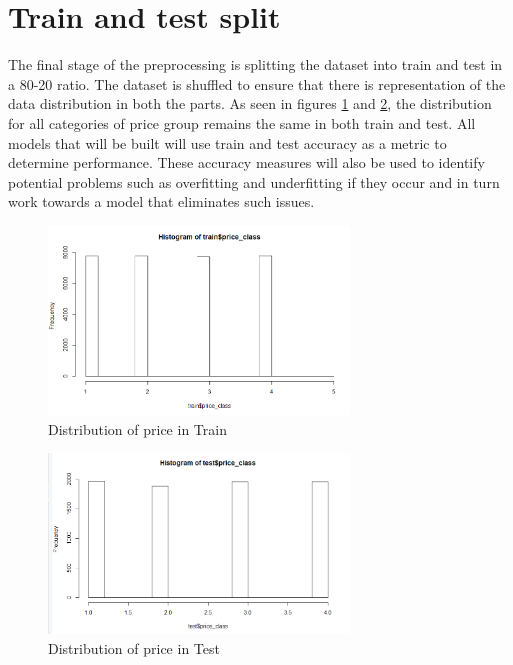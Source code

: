 \documentclass{sig-alternate}
\begin{document}
	\section{Train and test split}
	The final stage of the preprocessing is splitting the dataset into train and test in a 80-20 ratio. The dataset is shuffled to ensure that there is representation of the data distribution in both the parts. As seen in figures \ref{trainhist} and \ref{testhist}, the distribution for all categories of price group remains the same in both train and test. All models that will be built will use train and test accuracy as a metric to determine performance. These accuracy measures will also be used to identify potential problems such as overfitting and underfitting if they occur and in turn work towards a model that eliminates such issues.  
	\begin{figure}[ht]
		\includegraphics[width=8cm]{trainhist.png}
		\caption{Distribution of price in Train}
		\label{trainhist}
		\centering
	\end{figure}
	\begin{figure}[ht]
		\includegraphics[width=8cm]{testhist.png}
		\caption{Distribution of price in Test}
		\label{testhist}
		\centering
	\end{figure}
\end{document}
